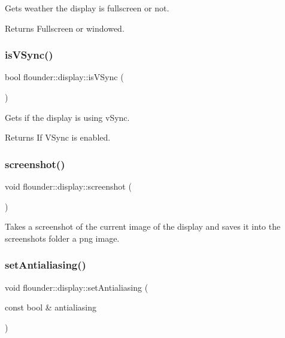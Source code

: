 Gets weather the display is fullscreen or not. 

\begin{DoxyReturn}{Returns}
Fullscreen or windowed. 
\end{DoxyReturn}
\mbox{\label{classflounder_1_1display_a75f2ff773d4d26740df8531b20b0a091}} 
\subsubsection{\texorpdfstring{is\+V\+Sync()}{isVSync()}}
{\footnotesize\ttfamily bool flounder\+::display\+::is\+V\+Sync (\begin{DoxyParamCaption}{ }\end{DoxyParamCaption})}



Gets if the display is using v\+Sync. 

\begin{DoxyReturn}{Returns}
If V\+Sync is enabled. 
\end{DoxyReturn}
\mbox{\label{classflounder_1_1display_af27b3f93977c32c79ad9522672e484c5}} 
\subsubsection{\texorpdfstring{screenshot()}{screenshot()}}
{\footnotesize\ttfamily void flounder\+::display\+::screenshot (\begin{DoxyParamCaption}{ }\end{DoxyParamCaption})}



Takes a screenshot of the current image of the display and saves it into the screenshots folder a png image. 

\mbox{\label{classflounder_1_1display_ae9a340bfa09dfd6d08ebc0d21b4c77b0}} 
\subsubsection{\texorpdfstring{set\+Antialiasing()}{setAntialiasing()}}
{\footnotesize\ttfamily void flounder\+::display\+::set\+Antialiasing (\begin{DoxyParamCaption}\item[{const bool \&}]{antialiasing }\end{DoxyParamCaption})}



